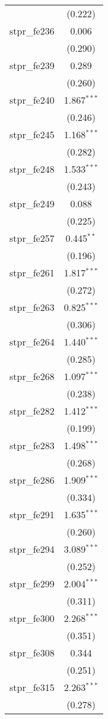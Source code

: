 \begin{table}[!htbp]
\begin{tabular}{@{\extracolsep{5pt}}lc}
  & (0.222) \\ 
  stpr\_fe236 & 0.006 \\ 
  & (0.290) \\ 
  stpr\_fe239 & 0.289 \\ 
  & (0.260) \\ 
  stpr\_fe240 & 1.867$^{***}$ \\ 
  & (0.246) \\ 
  stpr\_fe245 & 1.168$^{***}$ \\ 
  & (0.282) \\ 
  stpr\_fe248 & 1.533$^{***}$ \\ 
  & (0.243) \\ 
  stpr\_fe249 & 0.088 \\ 
  & (0.225) \\ 
  stpr\_fe257 & 0.445$^{**}$ \\ 
  & (0.196) \\ 
  stpr\_fe261 & 1.817$^{***}$ \\ 
  & (0.272) \\ 
  stpr\_fe263 & 0.825$^{***}$ \\ 
  & (0.306) \\ 
  stpr\_fe264 & 1.440$^{***}$ \\ 
  & (0.285) \\ 
  stpr\_fe268 & 1.097$^{***}$ \\ 
  & (0.238) \\ 
  stpr\_fe282 & 1.412$^{***}$ \\ 
  & (0.199) \\ 
  stpr\_fe283 & 1.498$^{***}$ \\ 
  & (0.268) \\ 
  stpr\_fe286 & 1.909$^{***}$ \\ 
  & (0.334) \\ 
  stpr\_fe291 & 1.635$^{***}$ \\ 
  & (0.260) \\ 
  stpr\_fe294 & 3.089$^{***}$ \\ 
  & (0.252) \\ 
  stpr\_fe299 & 2.004$^{***}$ \\ 
  & (0.311) \\ 
  stpr\_fe300 & 2.268$^{***}$ \\ 
  & (0.351) \\ 
  stpr\_fe308 & 0.344 \\ 
  & (0.251) \\ 
  stpr\_fe315 & 2.263$^{***}$ \\ 
  & (0.278) \\ 

\end{tabular}
\end{table}
